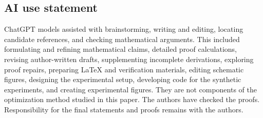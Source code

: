 \noindent\begin{minipage}{\linewidth}
\subsection*{AI use statement}
ChatGPT models assisted with brainstorming, writing and editing, locating
candidate references, and checking mathematical arguments. This included
formulating and refining mathematical claims, detailed proof calculations,
revising author-written drafts, supplementing incomplete derivations,
exploring proof repairs, preparing LaTeX and verification materials,
editing schematic figures, designing the experimental setup,
developing code for the synthetic experiments, and creating experimental
figures. They are not components of the
optimization method studied in this paper. The authors have checked the proofs.
Responsibility for the final
statements and proofs remains with the authors.
\end{minipage}\par

